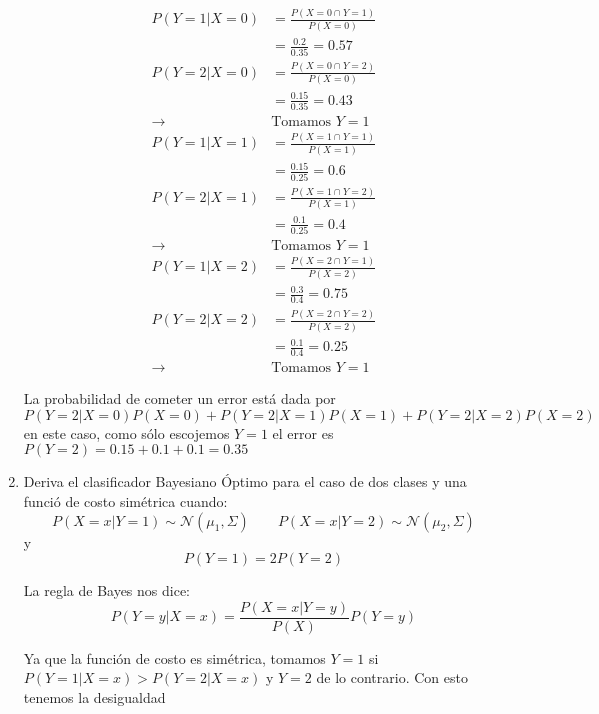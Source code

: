 \documentclass{article}
\begin{document}
\begin{enumerate}
\begin{multicols}{3}
\small
  \begin{align*}
    P(Y = 1 | X = 0) &= \frac{P( X = 0 \cap Y = 1)}{P(X = 0)}\\
                     &= \frac{0.2}{0.35} = 0.57\\
    P(Y = 2 | X = 0) &= \frac{P( X = 0 \cap Y = 2)}{P(X = 0)}\\
                     &= \frac{0.15}{0.35} = 0.43\\
         \rightarrow & \text{Tomamos } Y = 1
  \end{align*}\break
  \begin{align*}
    P(Y = 1 | X = 1) &= \frac{P( X = 1 \cap Y = 1)}{P(X = 1)}\\
                     &= \frac{0.15}{0.25} = 0.6\\
    P(Y = 2 | X = 1) &= \frac{P( X = 1 \cap Y = 2)}{P(X = 1)}\\
                     &= \frac{0.1}{0.25} = 0.4\\
         \rightarrow & \text{Tomamos } Y = 1
  \end{align*}\break
  \begin{align*}
    P(Y = 1 | X = 2) &= \frac{P( X = 2 \cap Y = 1)}{P(X = 2)}\\
                     &= \frac{0.3}{0.4} = 0.75\\
    P(Y = 2 | X = 2) &= \frac{P( X = 2 \cap Y = 2)}{P(X = 2)}\\
                     &= \frac{0.1}{0.4} = 0.25\\
         \rightarrow & \text{Tomamos } Y = 1
  \end{align*}
\end{multicols}

La probabilidad de cometer un error está dada por
$$P(Y = 2 | X = 0)P(X = 0) + P(Y = 2 | X = 1)P(X = 1) + P(Y = 2 | X = 2)P(X = 2)$$
en este caso, como sólo escojemos $Y = 1$ el error es $P(Y = 2) = 0.15 + 0.1 + 0.1 = 0.35$

\item Deriva el clasificador Bayesiano Óptimo para el caso de dos clases y una funció de costo simétrica cuando:
  $$ P(X = x|Y = 1) \sim \mathcal{N}(\mu_1, \Sigma) \qquad P(X = x|Y = 2) \sim \mathcal{N}(\mu_2, \Sigma) $$
y
  $$ P(Y = 1) = 2 P(Y = 2)$$

La regla de Bayes nos dice:
  $$P(Y = y | X = x) = \frac{P(X = x | Y = y)}{P(X)}P(Y = y)$$

Ya que la función de costo es simétrica, tomamos $Y = 1$ si $P(Y = 1 | X = x) > P(Y = 2 | X = x)$ y $Y = 2$ de lo contrario. Con esto tenemos la desigualdad


\end{enumerate}
\end{document}
